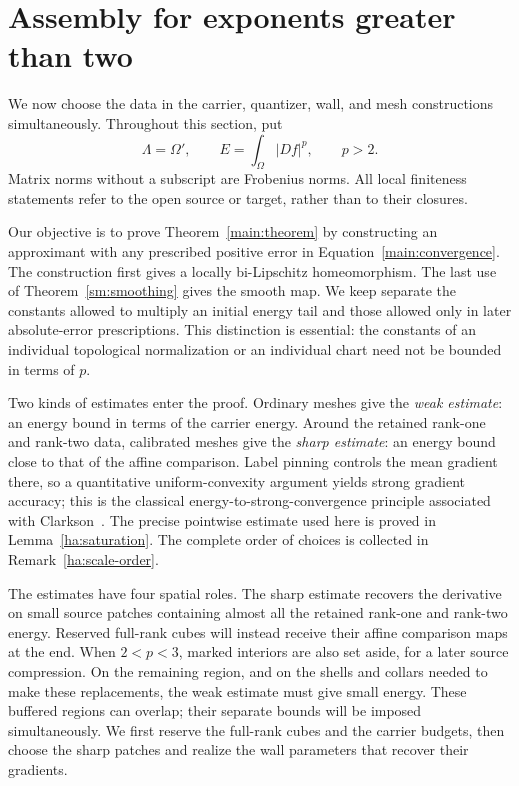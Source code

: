\section{Assembly for exponents greater than two}
\label{ha:section}\label{sec:high-assembly}

We now choose the data in the carrier, quantizer, wall, and mesh
constructions simultaneously.  Throughout this section, put
\[
 \Lambda=\Omega',\qquad E=\int_\Omega |Df|^p,\qquad p>2.
\]
Matrix norms without a subscript are Frobenius norms.  All local
finiteness statements refer to the open source or target, rather than
to their closures.

Our objective is to prove Theorem~\ref{main:theorem} by constructing
an approximant with any prescribed positive error in
Equation~\eqref{main:convergence}.  The construction first gives a
locally bi-Lipschitz homeomorphism.  The last use of
Theorem~\ref{sm:smoothing} gives the smooth map.
We keep separate the constants allowed to multiply an
initial energy tail and those allowed only in later absolute-error
prescriptions.  This distinction is essential: the constants of an
individual topological normalization or an individual chart need not
be bounded in terms of $p$.

Two kinds of estimates enter the proof.  Ordinary meshes give the
\emph{weak estimate}: an energy bound in terms of the carrier energy.
Around the retained rank-one and rank-two data, calibrated meshes give
the \emph{sharp estimate}: an energy bound close to that of the affine
comparison.  Label pinning controls the mean gradient there, so a
quantitative uniform-convexity argument yields strong gradient accuracy;
this is the classical energy-to-strong-convergence principle associated
with Clarkson~\cite{Clarkson1936}.  The precise pointwise estimate used
here is proved in Lemma~\ref{ha:saturation}.  The complete order of choices
is collected in Remark~\ref{ha:scale-order}.

The estimates have four spatial roles.  The sharp estimate recovers
the derivative on small source patches containing almost all the
retained rank-one and rank-two energy.  Reserved full-rank cubes
will instead receive their affine comparison maps at the end.
When $2<p<3$, marked interiors are also set aside, for a later
source compression.  On the remaining region, and on the shells
and collars needed to make these replacements, the weak estimate
must give small energy.  These buffered regions can overlap;
their separate bounds will be imposed simultaneously.  We first
reserve the full-rank cubes and the carrier budgets, then choose
the sharp patches and realize the wall parameters that recover
their gradients.

